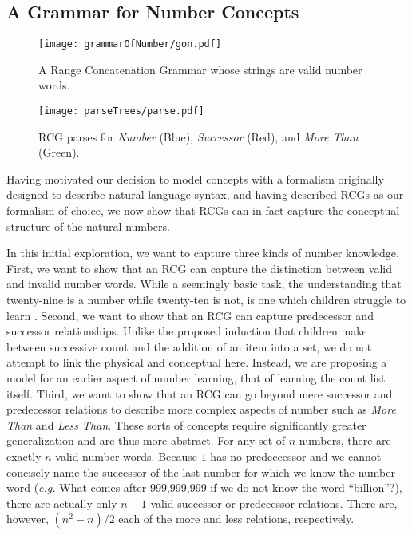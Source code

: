 \documentclass[10pt,letterpaper]{article}
\begin{document}
\subsection{A Grammar for Number Concepts}

\begin{figure*}[t]
  \begin{centering}
    \texttt{[image: grammarOfNumber/gon.pdf]}
    \caption{A Range Concatenation Grammar whose strings are valid number words.}
    \label{fig:gon}
  \end{centering}
\end{figure*}

\begin{figure*}[t]
  \begin{centering}
    \texttt{[image: parseTrees/parse.pdf]}
    \caption{RCG parses for \emph{Number} (Blue), \emph{Successor} (Red), and \emph{More Than} (Green).}
    \label{fig:parse}
  \end{centering}
\end{figure*}

Having motivated our decision to model concepts with a formalism
originally designed to describe natural language syntax, and having
described RCGs as our formalism of choice, we now show that RCGs can
in fact capture the conceptual structure of the natural numbers.

In this initial exploration, we want to capture three kinds of number
knowledge. First, we want to show that an RCG can capture the
distinction between valid and invalid number words. While a seemingly
basic task, the understanding that twenty-nine is a number while
twenty-ten is not, is one which children struggle to learn
\citep{FusRicBriar1982}. Second, we want to show that an RCG can
capture predecessor and successor relationships. Unlike the proposed
induction that children make between successive count and the addition
of an item into a set, we do not attempt to link the physical and
conceptual here. Instead, we are proposing a model for an earlier
aspect of number learning, that of learning the count list
itself. Third, we want to show that an RCG can go beyond mere
successor and predecessor relations to describe more complex aspects
of number such as \emph{More Than} and \emph{Less Than}. These sorts
of concepts require significantly greater generalization and are thus
more abstract. For any set of $n$ numbers, there are exactly $n$ valid
number words. Because $1$ has no predeccessor and we cannot concisely
name the successor of the last number for which we know the number
word ({\it e.g.}  What comes after 999,999,999 if we do not know the
word ``billion''?), there are actually only $n-1$ valid successor or
predecessor relations. There are, however, $(n^2-n)/2$ each of the
more and less relations, respectively.
\end{document}

